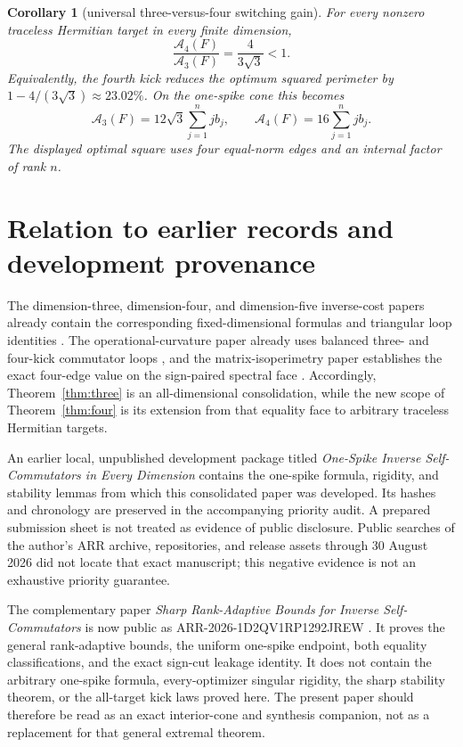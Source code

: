 \documentclass[11pt]{article}
\newtheorem{corollary}[theorem]{Corollary}
\theoremstyle{definition}
\theoremstyle{remark}
\newcommand{\1}{\mathbf 1}
\begin{document}
\begin{corollary}[universal three-versus-four switching gain]
\label{cor:gain}
For every nonzero traceless Hermitian target in every finite dimension,
\begin{equation}
 \boxed{\quad
 \frac{\mathcal A_4(F)}{\mathcal A_3(F)}
 =\frac{4}{3\sqrt3}<1.
 \quad}
 \label{eq:gain}
\end{equation}
Equivalently, the fourth kick reduces the optimum squared perimeter by
$1-4/(3\sqrt3)\approx23.02\%$.
On the one-spike cone this becomes
\[
 \mathcal A_3(F)=12\sqrt3\sum_{j=1}^n j b_j,
 \qquad
 \mathcal A_4(F)=16\sum_{j=1}^n j b_j.
\]
The displayed optimal square uses four equal-norm edges and an internal factor
of rank $n$.
\end{corollary}

\section{Relation to earlier records and development provenance}

The dimension-three, dimension-four, and dimension-five inverse-cost papers
already contain the corresponding fixed-dimensional formulas and triangular
loop identities \cite{erikssonQutrit,erikssonFour,erikssonFive}.  The
operational-curvature paper already uses balanced three- and four-kick
commutator loops \cite{erikssonOperational}, and the matrix-isoperimetry paper
establishes the exact four-edge value on the sign-paired spectral face
\cite{erikssonIsoperimetry}.  Accordingly, Theorem~\ref{thm:three} is an
all-dimensional consolidation, while the new scope of Theorem~\ref{thm:four}
is its extension from that equality face to arbitrary traceless Hermitian
targets.

An earlier local, unpublished development package titled \emph{One-Spike
Inverse Self-Commutators in Every Dimension} contains the one-spike formula,
rigidity, and stability lemmas from which this consolidated paper was
developed.  Its hashes and chronology are preserved in the accompanying
priority audit.  A prepared submission sheet is not treated as evidence of
public disclosure.  Public searches of the author's ARR archive,
repositories, and release assets through 30 August 2026 did not locate that exact
manuscript; this negative evidence is not an exhaustive priority guarantee.

The complementary paper \emph{Sharp Rank-Adaptive Bounds for Inverse
Self-Commutators} is now public as ARR-2026-1D2QV1RP1292JREW
\cite{erikssonRankAdaptive}.  It proves the general rank-adaptive bounds, the
uniform one-spike endpoint, both equality classifications, and the exact
sign-cut leakage identity.  It does not contain the arbitrary one-spike
formula, every-optimizer singular rigidity, the sharp stability theorem, or
the all-target kick laws proved here.  The present paper should therefore be
read as an exact interior-cone and synthesis companion, not as a replacement
for that general extremal theorem.
\end{document}
